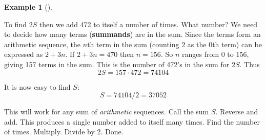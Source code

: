 \documentclass[12pt,]{book}
\newcommand{\terminology}[1]{\textbf{#1}}
\theoremstyle{plain}
\theoremstyle{definition}
\theoremstyle{definition}
\newtheorem{example}[theorem]{Example}
\theoremstyle{definition}
\numberwithin{equation}{chapter}
\begin{document}
\begin{example}[]
\hypertarget{p-139}{}%
To find \(2S\) then we add 472 to itself a number of times. What number? We need to decide how many terms (\terminology{summands}) are in the sum. Since the terms form an arithmetic sequence, the \(n\)th term in the sum (counting \(2\) as the 0th term) can be expressed as \(2 + 3n\). If \(2 + 3n = 470\) then \(n = 156\). So \(n\) ranges from 0 to 156, giving 157 terms in the sum. This is the number of 472's in the sum for \(2S\). Thus%
\begin{equation*}
2S = 157\cdot 472 = 74104
\end{equation*}
%
\par
\hypertarget{p-140}{}%
It is now easy to find \(S\):%
\begin{equation*}
S = 74104/2 = 37052
\end{equation*}
%
\end{example}
\hypertarget{p-141}{}%
This will work for any sum of \emph{arithmetic} sequences. Call the sum \(S\). Reverse and add. This produces a single number added to itself many times. Find the number of times. Multiply. Divide by 2. Done.%
\end{document}
